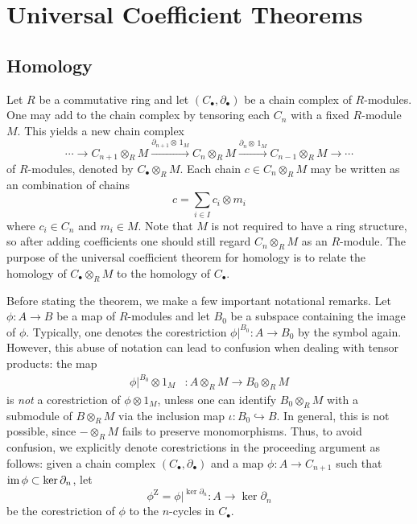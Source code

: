 \section{Universal Coefficient Theorems}



\subsection{Homology}

Let $R$ be a commutative ring and let $(C_\bullet, \partial_\bullet)$ be a chain complex of $R$-modules. One may add  to the chain complex by tensoring each $C_n$ with a fixed $R$-module $M$. This yields a new chain complex
\begin{equation*}
    \cdots \to C_{n+1} \otimes_R M \xrightarrow{\partial_{n+1} \otimes\, 1_M} C_n \otimes_R M \xrightarrow{\partial_n \otimes\, 1_M} C_{n-1} \otimes_R M \to \cdots
\end{equation*}
of $R$-modules, denoted by $C_\bullet \otimes_R M$. Each chain $c \in C_n \otimes_R M$ may be written as an  combination of chains
\begin{equation*}
    c = \sum_{i \in I} c_i \otimes m_i
\end{equation*}
where $c_i \in C_n$ and $m_i \in M$. Note that $M$ is not required to have a ring structure, so after adding coefficients one should still regard $C_n \otimes_R M$ as an $R$-module.  The purpose of the universal coefficient theorem for homology is to relate the homology of $C_\bullet \otimes_R M$ to the homology of $C_\bullet$.

Before stating the theorem, we make a few important notational remarks. Let $\phi \colon A \to B$  be a map of $R$-modules and let $B_0$ be a subspace containing the image of $\phi$.  Typically, one denotes the corestriction $\phi|^{B_0} \colon A \to B_0$ by the symbol \say{$\phi$} again. However, this abuse of notation can lead to confusion when dealing with tensor products: the map
\begin{align*}
    \phi|^{B_0} \otimes 1_M &\colon A \otimes_R M \to B_0 \otimes_R M
\end{align*}
is \emph{not} a corestriction of $\phi \otimes 1_M$, unless one can identify $B_0 \otimes_R M$ with a submodule of $B \otimes_R M$ via the inclusion map $\iota \colon B_0 \hookrightarrow B$. In general, this is not possible, since $- \otimes_R M$ fails to preserve monomorphisms. Thus, to avoid confusion, we explicitly denote corestrictions in the proceeding argument as follows: given a chain complex $(C_\bullet, \partial_\bullet)$ and a map $\phi \colon A \to C_{n+1}$ such that $\operatorname{im} \phi \subset \ker \partial_{n}$, let
\begin{equation*}
  \phi^{\mathrm{Z}} = \phi|^{\ker \partial_{n}} \colon A \to \ker \partial_{n}
\end{equation*}
be the corestriction of $\phi$ to the $n$-cycles in $C_\bullet$. 


